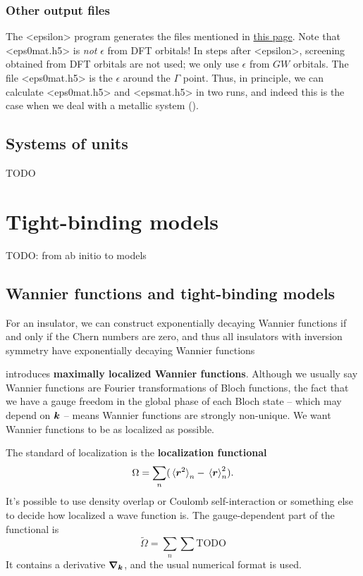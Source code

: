 \documentclass[hyperref, a4paper]{report}
\newcommand*{\concept}[1]{{\textbf{#1}}}
\def\texttt#1{<#1>}%
\newcommand{\shortcode}[1]{\texttt{#1}}
\begin{document}
\subsection{Other output files}

The \shortcode{epsilon} program generates the files mentioned in 
\href{http://manual.berkeleygw.org/2.0/epsilon-overview/}{this page}.
Note that \shortcode{eps0mat.h5} is \emph{not} $\epsilon$ from DFT orbitals!
In steps after \shortcode{epsilon},
screening obtained from DFT orbitals are not used;
we only use $\epsilon$ from $GW$ orbitals.
The file \shortcode{eps0mat.h5} is the $\epsilon$ around the $\Gamma$ point.
Thus, in principle,
we can calculate \shortcode{eps0mat.h5} and \shortcode{epsmat.h5}
in two runs,
and indeed this is the case when we deal with a metallic system
().

\section{Systems of units}

TODO


\chapter{Tight-binding models}

TODO: from ab initio to models

\section{Wannier functions and tight-binding models}

For an insulator,
we can construct exponentially decaying Wannier functions 
if and only if the Chern numbers are zero, 
and thus all insulators with inversion symmetry 
have exponentially decaying Wannier functions \cite{brouder2007exponential}

\cite{marzari2012maximally} introduces \concept{maximally localized Wannier functions}.
Although we usually say Wannier functions are Fourier transformations of Bloch functions,
the fact that we have a gauge freedom in the global phase of each Bloch state
-- which may depend on $\vb*{k}$ --  
means Wannier functions are strongly non-unique.
We want Wannier functions to be as localized as possible. 

The standard of localization is the \concept{localization functional}
\begin{equation}
    \Omega = \sum_n (\expval*{\vb*{r}^2}_n - \expval*{\vb*{r}}_n^2).
\end{equation}
It's possible to use density overlap or Coulomb self-interaction 
or something else 
to decide how localized a wave function is. 
The gauge-dependent part of the functional 
is 
\begin{equation}
    \tilde{\Omega} = \sum_n \sum_{} \text{TODO}
\end{equation}
It contains a derivative $\grad_{\vb*{k}}$,
and the usual numerical format is used. 
\end{document}
